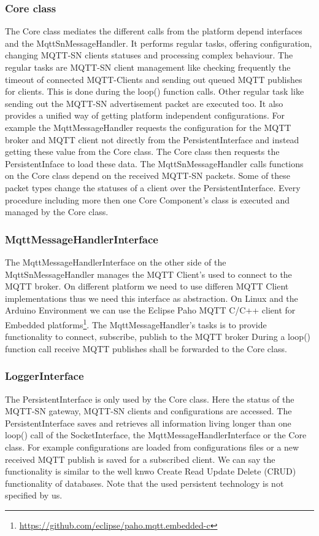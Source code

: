 \subsubsection{Core class}
The Core class mediates the different calls from the platform depend interfaces and the MqttSnMessageHandler.
It performs regular tasks, offering configuration, changing MQTT-SN clients statuses and processing complex behaviour.
The regular tasks are MQTT-SN client management like checking frequently the timeout of connected MQTT-Clients and sending out queued MQTT publishes for clients.
This is done during the loop() function calls.
Other regular task like sending out the MQTT-SN advertisement packet are executed too.
It also provides a unified way of getting platform independent configurations.
For example the MqttMessageHandler requests the configuration for the MQTT broker and MQTT client not directly from the PersistentInterface and instead getting these value from the Core class. The Core class then requests the PersistentInface to load these data.
The MqttSnMessageHandler calls functions on the Core class depend on the received MQTT-SN packets. Some of these packet types change the statuses of a client over the PersistentInterface.
Every procedure including more then one Core Component's class is executed and managed by the Core class.

\subsubsection{MqttMessageHandlerInterface}
The MqttMessageHandlerInterface on the other side of the MqttSnMessageHandler manages the MQTT Client's used to connect to the MQTT broker.
On different platform we need to use differen MQTT Client implementations thus we need this interface as abstraction.
On Linux and the Arduino Environment we can use the Eclipse Paho MQTT C/C++ client for Embedded platforms\footnote{\url{https://github.com/eclipse/paho.mqtt.embedded-c}}.
The MqttMessageHandler's tasks is to provide functionality to connect, subscribe, publish to the MQTT broker
During a loop() function call receive MQTT publishes shall be forwarded to the Core class.

\subsubsection{LoggerInterface}
The PersistentInterface is only used by the Core class.
Here the status of the MQTT-SN gateway, MQTT-SN clients and configurations are accessed.
The PersistentInterface saves and retrieves all information living longer than one loop() call of the SocketInterface, the MqttMessageHandlerInterface or the Core class.
For example configurations are loaded from configurations files or a new received MQTT publish is saved for a subscribed client.
We can say the functionality is similar to the well knwo Create Read Update Delete (CRUD) functionality of databases.
Note that the used persistent technology is not specified by us.

